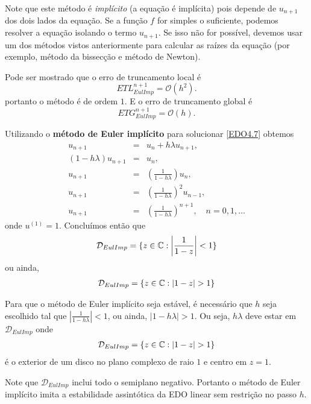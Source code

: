 Note que este método é \emph{implícito} (a equação é implícita) pois depende de $u_{n+1}$ dos dois lados da equação. Se a função $f$ for simples o suficiente, podemos resolver a equação isolando o termo $u_{n+1}$. Se isso não for possível, devemos usar um dos métodos vistos anteriormente para calcular as raízes da equação (por exemplo, método da bissecção e método de Newton).



Pode ser mostrado que o erro de truncamento local é
$$ETL_{EulImp}^{n+1}= \mathcal{O}(h^2).$$
portanto o método é de ordem $1$. E o erro de truncamento global é
$$ETG_{EulImp}^{n+1}= \mathcal{O}(h).$$



\begin{ex}
Utilizando o \textbf{método de Euler implícito} para solucionar \eqref{EDO4.7} obtemos
\begin{eqnarray}
 u_{n+1}      &=& u_n+h\lambda u_{n+1}, \\
 (1-h\lambda )u_{n+1} & =& u_n, \\
       u_{n+1} & =& \left(\frac{1}{1- h\lambda }\right)u_n, \\
       u_{n+1} & =& \left(\frac{1}{1- h\lambda }\right)^2u_{n-1}, \\
       u_{n+1} & =& \left(\frac{1}{1- h\lambda }\right)^{n+1}, \quad  n=0,1,\ldots
\end{eqnarray}
onde $u^{(1)}=1$.
Concluímos então que
\begin{eqnarray}
 \mathcal D_{EulImp} = \{z \in  \mathbb{C}:  \left|\frac{1}{1- z}\right|<1\}
\end{eqnarray}
ou ainda,
\begin{eqnarray}
 \mathcal D_{EulImp} = \{z \in  \field{C}:  |1- z|>1\}
\end{eqnarray}

Para que o método de Euler implícito seja estável, é necessário que $h$ seja escolhido tal que $\left|\frac{1}{1- h\lambda }\right|<1$, ou ainda, $|1-h\lambda |>1$. Ou seja, $h\lambda $ deve estar em $\mathcal D_{EulImp}$ onde
\begin{eqnarray}
 \mathcal D_{EulImp} = \{z \in  \field{C}: |1-z|>1\}
\end{eqnarray}
é o exterior de um disco no plano complexo de raio $1$ e centro em $z=1$.

Note que $\mathcal D_{EulImp}$ inclui todo o semiplano negativo. Portanto o método de Euler implícito imita a estabilidade assintótica da EDO linear sem restrição no passo $h$.

\end{ex}

